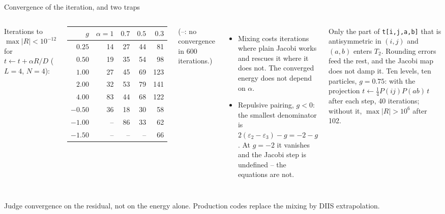 \documentclass[aspectratio=169,10pt]{beamer}
\newcommand{\warnbox}[1]{%
  \begin{tcolorbox}[colback=palewarm,colframe=warm,title={\bfseries A trap to avoid}]
  #1
  \end{tcolorbox}}
\begin{document}
\begin{frame}[shrink=4]{Convergence of the iteration, and two traps}
\small
\begin{columns}[T]
Iterations to $\max|R|<10^{-12}$ for $t\leftarrow t+\alpha R/D$ ($L=4$, $N=4$):
\begin{center}
\footnotesize\renewcommand{\arraystretch}{1.1}
\begin{tabular}{rrrrr}
\toprule
$g$ & $\alpha=1$ & $0.7$ & $0.5$ & $0.3$\\
\midrule
$0.25$ & 14 & 27 & 44 & 81\\
$0.50$ & 19 & 35 & 54 & 98\\
$1.00$ & 27 & 45 & 69 & 123\\
$2.00$ & 32 & 53 & 79 & 141\\
$4.00$ & 83 & 44 & 68 & 122\\
$-0.50$ & 36 & 18 & 30 & 58\\
$-1.00$ & -- & 86 & 33 & 62\\
$-1.50$ & -- & -- & -- & 66\\
\bottomrule
\end{tabular}
\end{center}
(--: no convergence in 600 iterations.)
\begin{itemize}
\item Mixing costs iterations where plain Jacobi works and rescues it where it does not. The converged energy does not depend on $\alpha$.
\item Repulsive pairing, $g<0$: the smallest denominator is $2(\varepsilon_2-\varepsilon_3)-g=-2-g$. At $g=-2$ it vanishes and the Jacobi step is undefined -- the equations are not.
\end{itemize}
\warnbox{\small Only the part of \texttt{t[i,j,a,b]} that is antisymmetric in $(i,j)$ and $(a,b)$ enters $T_2$. Rounding errors feed the rest, and the Jacobi map does not damp it. Ten levels, ten particles, $g=0.75$: with the projection $t\leftarrow\tfrac14P(ij)P(ab)\,t$ after each step, 40 iterations; without it, $\max|R|>10^6$ after 102.}
\end{columns}
\vspace{0.3em}
Judge convergence on the residual, not on the energy alone. Production codes replace the mixing by DIIS extrapolation.
\end{frame}
\end{document}
